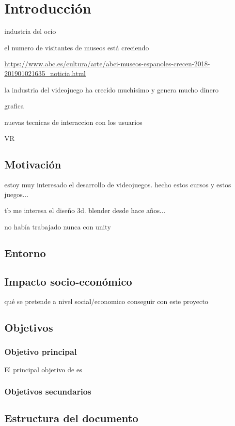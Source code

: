\chapter{Introducción}
\label{chap:introduccion}

industria del ocio

el numero de visitantes de museos está creciendo

\url{https://www.abc.es/cultura/arte/abci-museos-espanoles-crecen-2018-201901021635_noticia.html}

la industria del videojuego ha crecído muchisimo y genera mucho dinero

grafica

nuevas tecnicas de interaccion con los usuarios

VR


\section{Motivación}

estoy muy interesado el desarrollo de videojuegos. hecho estos cursos y estos juegos...

tb me interesa el diseño 3d. blender desde hace años...

no había trabajado nunca con unity

\section{Entorno}

\section{Impacto socio-económico}

qué se pretende a nivel social/economico conseguir con este proyecto

\section{Objetivos}

\subsection{Objetivo principal}

El principal objetivo de \MineRVa es 

\subsection{Objetivos secundarios}

\section{Estructura del documento}